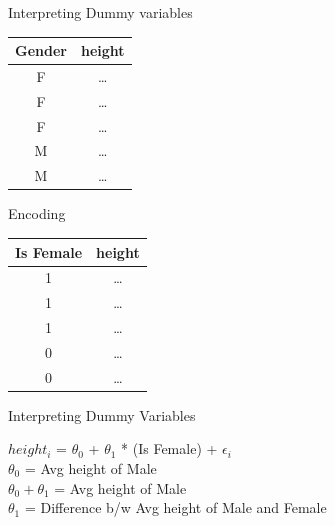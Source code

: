 \documentclass{beamer}
\begin{document}
\begin{frame}{Interpreting Dummy variables}
    \begin{center}
        \begin{tabular}{c|c}
        Gender& height\\
        \hline
        \hline
            F & \dots \\
            F & \dots \\
            F & \dots \\
            M & \dots \\
            M & \dots \\
        \end{tabular}
            
    \end{center}
    
    Encoding
    
        \begin{center}
        \begin{tabular}{c|c}
        Is Female& height\\
        \hline
        \hline
            1 & \dots \\
            1 & \dots \\
            1 & \dots \\
            0 & \dots \\
            0 & \dots \\
        \end{tabular}
    \end{center}

\end{frame}

\begin{frame}{Interpreting Dummy Variables}
    
    $height_{i}$ = $\theta_{0}$ + $\theta_{1}$ *  (Is Female) + $\epsilon_{i}$\\
    \vspace{1em}
    $\theta_{0}$ = Avg height of Male\\
    $\theta_{0} + \theta_{1}$ = Avg height of Male\\
    $\theta_{1}$ = Difference b/w Avg height of Male and Female
\end{frame}
\end{document}
